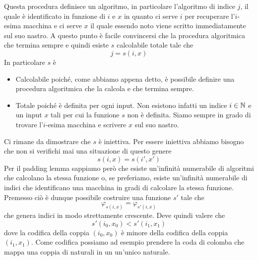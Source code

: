 Questa procedura definisce un algoritmo, in particolare
l'algoritmo di indice $j$, il quale è identificato in funzione
di $i$ e $x$ in quanto ci serve $i$ per recuperare l'$i$-esima
macchina e ci serve $x$ il quale essendo noto viene scritto
immediatamente sul suo nastro. A questo punto è facile
convincersi che la procedura algoritmica che termina sempre e
quindi esiste $s$ calcolabile totale tale che
\[ j = s(i, x) \]
In particolare $s$ è
\begin{itemize}
	\item Calcolabile poiché, come abbiamo appena detto, è
	      possibile definire una procedura algoritmica che la
	      calcola e che termina sempre.
	\item Totale poiché è definita per ogni input. Non esistono
	      infatti un indice $i \in \mathbb{N}$ e un input $x$ tali per
	      cui la funzione $s$ non è definita. Siamo sempre in
	      grado di trovare l'$i$-esima macchina e scrivere $x$
	      sul suo nastro.
\end{itemize}
Ci rimane da dimostrare che $s$ è iniettiva. Per essere
iniettiva abbiamo bisogno che non si verifichi mai una
situazione di questo genere
\[ s(i, x) = s(i', x') \]
Per il padding lemma sappiamo però che esiste un'infinità
numerabile di algoritmi che calcolano la stessa funzione o, se
preferiamo, esiste un'infinità numerabile di indici che
identificano una macchina in gradi di calcolare la stessa
funzione. Premesso ciò è dunque possibile costruire una funzione
$s'$ tale che
\[ \varphi_{s(i, x)} = \varphi_{s'(i, x)} \]
che genera indici in modo strettamente crescente. Deve quindi
valere che
\[ s'(i_0, x_0) < s'(i_1, x_1) \]
dove la codifica della coppia $(i_0, x_0)$ è minore della
codifica della coppia $(i_1, x_1)$. Come codifica possiamo ad
esempio prendere la coda di colomba che mappa una coppia di
naturali in un un'unico naturale.